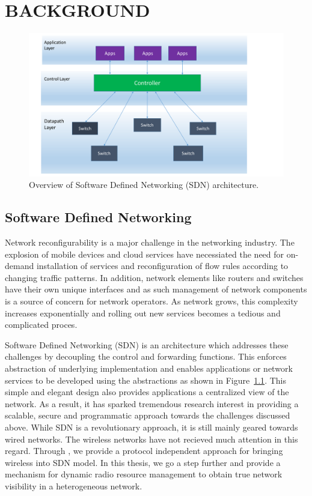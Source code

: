 \chapter{\uppercase {Background}}
\label{sec:background}
\begin{figure}[t]
  \centering
  \includegraphics[width=1\textwidth]{figures/SDN.pdf}
  \caption{Overview of Software Defined Networking (SDN) architecture.}
  \label{fig:SDN}
\end{figure}

\section{Software Defined Networking}
Network reconfigurability is a major challenge in the networking industry. The explosion of mobile devices and cloud services have necessiated the need for on-demand installation of services and reconfiguration of flow rules according to changing traffic patterns. In addition, network elements like routers and switches have their own unique interfaces and as such management of network components is a source of concern for network operators. As network grows, this complexity increases exponentially and rolling out new services becomes a tedious and complicated proces.

Software Defined Networking (SDN) is an architecture which addresses these challenges by decoupling the control and forwarding functions. This enforces abstraction of underlying implementation and enables applications or network services to be developed using the abstractions as shown in Figure~\ref{fig:SDN}. This simple and elegant design also provides applications a centralized view of the network. As a result, it has sparked tremendous research interest in providing a scalable, secure and programmatic approach towards the challenges discussed above. While SDN is a revolutionary approach, it is still mainly geared towards wired networks. The wireless networks have not recieved much attention in this regard. Through \aetherflow, we provide a protocol independent approach for bringing wireless into SDN model. In this thesis, we go a step further and provide a mechanism for dynamic radio resource management to obtain true network visibility in a heterogeneous network.     

